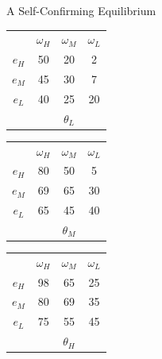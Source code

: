 \documentclass[aspectratio=169]{beamer}
\begin{document}
\begin{frame}{A Self-Confirming Equilibrium}

\centering
\begin{tabular}{ c|c|c|c|}
  
  \multicolumn{1}{c}{} & \multicolumn{1}{c}{$\omega_H$} & \multicolumn{1}{c}{$\omega_M$} & \multicolumn{1}{c}{$\omega_L$}\\
  \cline{2-4}
  $e_H$ & \cellcolor[HTML]{b84f79}50 & 20 & 2 \\
  \cline{2-4}
  $e_M$ & 45 & 30 & 7 \\
  \cline{2-4}
  $e_L$ & 40 & 25 & 20 \\
  \cline{2-4}
  \multicolumn{1}{c}{} & \multicolumn{1}{c}{} & \multicolumn{1}{c}{$\theta_L$} & \multicolumn{1}{c}{}\\
\end{tabular}
\hspace{.3cm} %
\begin{tabular}{ c|c|c|c|}
  
  \multicolumn{1}{c}{} & \multicolumn{1}{c}{$\omega_H$} & \multicolumn{1}{c}{$\omega_M$} & \multicolumn{1}{c}{$\omega_L$}\\
  \cline{2-4}
  $e_H$ & 80 & \cellcolor[HTML]{b84f79}50 & 5 \\
  \cline{2-4}
  $e_M$ & 69 &\cellcolor[HTML]{f09ebe}65 & 30 \\
  \cline{2-4}
  $e_L$ & 65 & \cellcolor[HTML]{f09ebe}45 & 40 \\
  \cline{2-4}
  \multicolumn{1}{c}{} & \multicolumn{1}{c}{} & \multicolumn{1}{c}{$\theta_M$} & \multicolumn{1}{c}{}\\
\end{tabular}
\hspace{.3cm} %
\begin{tabular}{ c|c|c|c|}
  
  \multicolumn{1}{c}{} & \multicolumn{1}{c}{$\omega_H$} & \multicolumn{1}{c}{$\omega_M$} & \multicolumn{1}{c}{$\omega_L$}\\
  \cline{2-4}
  $e_H$ & 98 & 65 & 25 \\
  \cline{2-4}
  $e_M$ & 80 & 69 & 35 \\
  \cline{2-4}
  $e_L$ & 75 & 55 & 45 \\
  \cline{2-4}
  \multicolumn{1}{c}{} & \multicolumn{1}{c}{} & \multicolumn{1}{c}{$\theta_H$} & \multicolumn{1}{c}{}\\
\end{tabular}
\end{frame}
\end{document}
